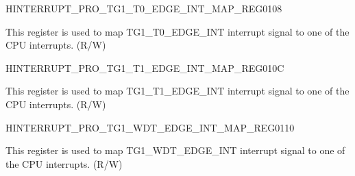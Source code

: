 \begin{register}{H}{INTERRUPT\_PRO\_TG1\_T0\_EDGE\_INT\_MAP\_REG}{\hexprefix{}0108}\label{regdesc:INTERRUPTPROTG1T0EDGEINTMAPREG}
%
%
\regnewline%
\begin{regdesc}\begin{reglist}
\label{fielddesc:INTERRUPTPROTG1T0EDGEINTMAP}\item [INTERRUPT\_PRO\_TG1\_T0\_EDGE\_INT\_MAP] This register is used to map TG1\_T0\_EDGE\_INT interrupt signal to one of the CPU interrupts. (R/W)
\end{reglist}\end{regdesc}
\end{register}


\begin{register}{H}{INTERRUPT\_PRO\_TG1\_T1\_EDGE\_INT\_MAP\_REG}{\hexprefix{}010C}\label{regdesc:INTERRUPTPROTG1T1EDGEINTMAPREG}
%
%
\regnewline%
\begin{regdesc}\begin{reglist}
\label{fielddesc:INTERRUPTPROTG1T1EDGEINTMAP}\item [INTERRUPT\_PRO\_TG1\_T1\_EDGE\_INT\_MAP] This register is used to map TG1\_T1\_EDGE\_INT interrupt signal to one of the CPU interrupts. (R/W)
\end{reglist}\end{regdesc}
\end{register}


\begin{register}{H}{INTERRUPT\_PRO\_TG1\_WDT\_EDGE\_INT\_MAP\_REG}{\hexprefix{}0110}\label{regdesc:INTERRUPTPROTG1WDTEDGEINTMAPREG}
%
%
\regnewline%
\begin{regdesc}\begin{reglist}
\label{fielddesc:INTERRUPTPROTG1WDTEDGEINTMAP}\item [INTERRUPT\_PRO\_TG1\_WDT\_EDGE\_INT\_MAP] This register is used to map TG1\_WDT\_EDGE\_INT interrupt signal to one of the CPU interrupts. (R/W)
\end{reglist}\end{regdesc}
\end{register}


